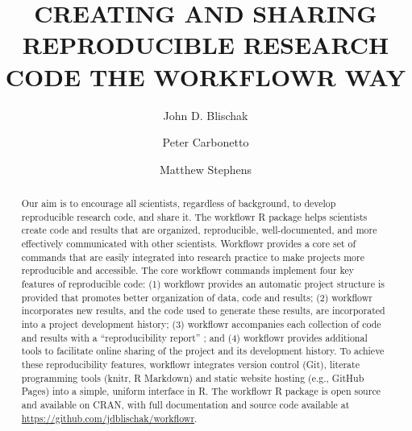\documentclass[9pt,a4paper]{extarticle}
\begin{document}
\pagestyle{front}

\title{CREATING AND SHARING REPRODUCIBLE RESEARCH CODE THE WORKFLOWR
WAY}

\author[1]{John D. Blischak}

\author[1,2]{Peter Carbonetto}

\author[1,3]{Matthew Stephens}




\maketitle

\thispagestyle{front}

\begin{abstract}


Our aim is to encourage all scientists, regardless of background, to
develop reproducible research code, and share it. The workflowr R
package helps scientists create code and results that are organized,
reproducible, well-documented, and more effectively communicated with
other scientists. Workflowr provides a core set of commands that are
easily integrated into research practice to make projects more
reproducible and accessible. The core workflowr commands implement four
key features of reproducible code: (1) workflowr provides an automatic
project structure is provided that promotes better organization of data,
code and results; (2) workflowr incorporates new results, and the code
used to generate these results, are incorporated into a project
development history; (3) workflowr accompanies each collection of code
and results with a “reproducibility report” ; and (4) workflowr provides
additional tools to facilitate online sharing of the project and its
development history. To achieve these reproducibility features,
workflowr integrates version control (Git), literate programming tools
(knitr, R Markdown) and static website hosting (e.g., GitHub Pages) into
a simple, uniform interface in R. The workflowr R package is open source
and available on CRAN, with full documentation and source code available
at \url{https://github.com/jdblischak/workflowr}.

\end{abstract}
\end{document}
